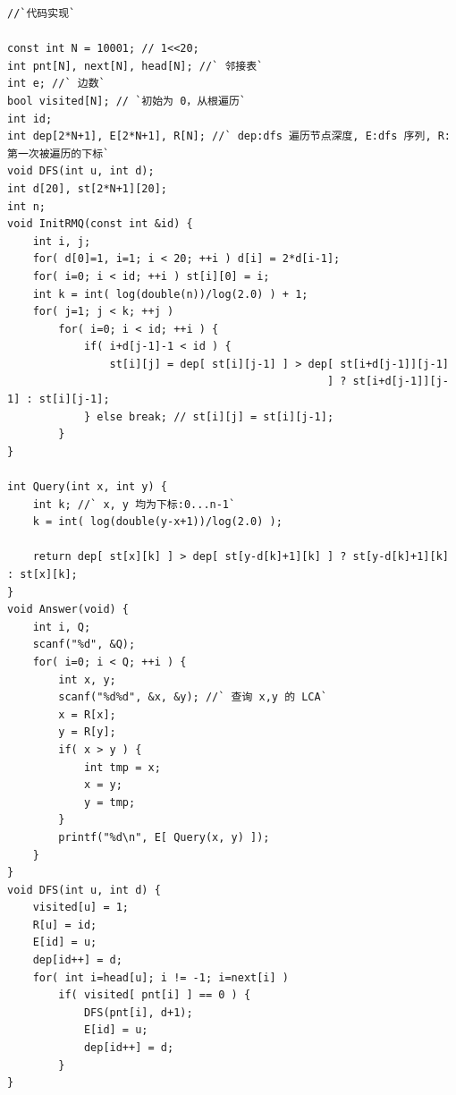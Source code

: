 \documentclass[a4paper]{article}
\begin{document}
\begin{CJK*}{UTF8}{gbsn}
\begin{multicols}{3}
\begin{flushleft}
\begin{lstlisting}
//`代码实现`

const int N = 10001; // 1<<20;
int pnt[N], next[N], head[N]; //` 邻接表`
int e; //` 边数`
bool visited[N]; // `初始为 0，从根遍历`
int id;
int dep[2*N+1], E[2*N+1], R[N]; //` dep:dfs 遍历节点深度, E:dfs 序列, R:第一次被遍历的下标`
void DFS(int u, int d);
int d[20], st[2*N+1][20];
int n;
void InitRMQ(const int &id) {
    int i, j;
    for( d[0]=1, i=1; i < 20; ++i ) d[i] = 2*d[i-1];
    for( i=0; i < id; ++i ) st[i][0] = i;
    int k = int( log(double(n))/log(2.0) ) + 1;
    for( j=1; j < k; ++j )
        for( i=0; i < id; ++i ) {
            if( i+d[j-1]-1 < id ) {
                st[i][j] = dep[ st[i][j-1] ] > dep[ st[i+d[j-1]][j-1]
                                                  ] ? st[i+d[j-1]][j-1] : st[i][j-1];
            } else break; // st[i][j] = st[i][j-1];
        }
}

int Query(int x, int y) {
    int k; //` x, y 均为下标:0...n-1`
    k = int( log(double(y-x+1))/log(2.0) );

    return dep[ st[x][k] ] > dep[ st[y-d[k]+1][k] ] ? st[y-d[k]+1][k] : st[x][k];
}
void Answer(void) {
    int i, Q;
    scanf("%d", &Q);
    for( i=0; i < Q; ++i ) {
        int x, y;
        scanf("%d%d", &x, &y); //` 查询 x,y 的 LCA`
        x = R[x];
        y = R[y];
        if( x > y ) {
            int tmp = x;
            x = y;
            y = tmp;
        }
        printf("%d\n", E[ Query(x, y) ]);
    }
}
void DFS(int u, int d) {
    visited[u] = 1;
    R[u] = id;
    E[id] = u;
    dep[id++] = d;
    for( int i=head[u]; i != -1; i=next[i] )
        if( visited[ pnt[i] ] == 0 ) {
            DFS(pnt[i], d+1);
            E[id] = u;
            dep[id++] = d;
        }
}
\end{lstlisting}


\end{flushleft}
\end{multicols}
\end{CJK*}
\end{document}

